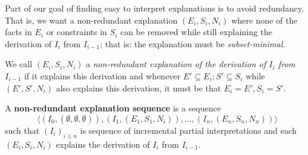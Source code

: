 Part of our goal of finding easy to interpret explanations is to avoid redundancy. 
That is, we want a non-redundant explanation $(E_i,S_i,N_i)$ where none of the facts in $E_i$ or constraints in $S_i$ can be removed while still explaining the derivation of $I_i$ from $I_{i-1}$; that is: the explanation must be \textit{subset-minimal}. 
\begin{definition}
 We call $(E_i,S_i,N_i)$ a \emph{non-redundant explanation of  the derivation of $I_i$ from $I_{i-1}$} if it explains this derivation and whenever $E'\subseteq E_i; S'\subseteq S_i$ while $(E',S',N_i)$ also explains this derivation, it must be that $E_i=E', S_i=S'$. 
\end{definition}

\begin{definition} \label{def:nonred}
A \textbf{non-redundant explanation sequence} is a sequence 
\[\langle(I_0,(\emptyset,\emptyset,\emptyset)), (I_1,(E_1,S_1,N_i)), \dots ,(I_n,(E_n,S_n,N_n))\rangle\]
such that $(I_i)_{i\leq n}$ is sequence of incremental partial interpretations and each $(E_i,S_i,N_i)$ explains the derivation of $I_i$ from $I_{i-1}$.
\end{definition} 





